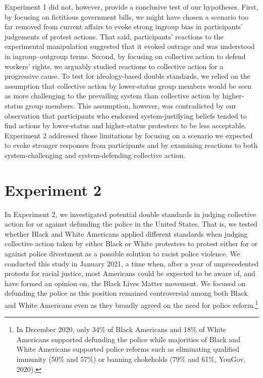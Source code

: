 \documentclass[twocolumn, 11pt, letterpaper]{article}
\begin{document}
Experiment 1 did not, however, provide a conclusive test of our
hypotheses. First, by focusing on fictitious government bills, we might
have chosen a scenario too far removed from current affairs to evoke
strong ingroup bias in participants' judgements of protest actions. That
said, participants' reactions to the experimental manipulation suggested
that it evoked outrage and was understood in ingroup--outgroup terms.
Second, by focusing on collective action to defend workers' rights, we
arguably studied reactions to collective action for a progressive cause.
To test for ideology-based double standards, we relied on the assumption
that collective action by lower-status group members would be seen as
more challenging to the prevailing system than collective action by
higher-status group members. This assumption, however, was contradicted
by our observation that participants who endorsed system-justifying
beliefs tended to find actions by lower-status and higher-status
protesters to be less acceptable. Experiment 2 addressed those
limitations by focusing on a scenario we expected to evoke stronger
responses from participants and by examining reactions to both
system-challenging and system-defending collective action.

\hypertarget{experiment-2}{%
\section{Experiment 2}\label{experiment-2}}

In Experiment 2, we investigated potential double standards in judging
collective action for or against defunding the police in the United
States. That is, we tested whether Black and White Americans applied
different standards when judging collective action taken by either Black
or White protesters to protest either for or against police divestment
as a possible solution to racist police violence. We conducted this
study in January 2021, a time when, after a year of unprecedented
protests for racial justice, most Americans could be expected to be
aware of, and have formed an opinion on, the Black Lives Matter
movement. We focused on defunding the police as this position remained
controversial among both Black and White Americans even as they broadly
agreed on the need for police reform.\footnote{In December 2020, only
  34\% of Black Americans and 18\% of White Americans supported
  defunding the police while majorities of Black and White Americans
  supported police reforms such as eliminating qualified immunity (50\%
  and 57\%) or banning chokeholds (79\% and 61\%, YouGov, 2020).}
\end{document}
